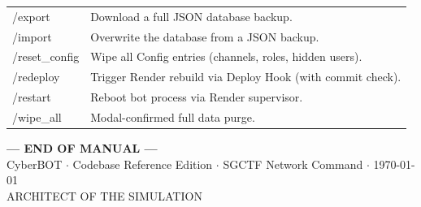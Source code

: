 \documentclass[12pt,a4paper]{report}
\begin{document}
\begin{longtable}{>{\ttfamily}l p{9.5cm}}
/export                & Download a full JSON database backup. \\
/import                & Overwrite the database from a JSON backup. \\
/reset\_config         & Wipe all Config entries (channels, roles, hidden users). \\
/redeploy             & Trigger Render rebuild via Deploy Hook (with commit check). \\
/restart              & Reboot bot process via Render supervisor. \\
/wipe\_all             & Modal-confirmed full data purge. \\
\bottomrule
\end{longtable}

\vspace{1cm}
\begin{center}
\begin{tcolorbox}[colback=cyberdark, coltext=white, colframe=cybergold,
                  width=13cm, center]
    \centering\color{cybergold}
    \large\textbf{--- END OF MANUAL ---}\\[0.3cm]
    \color{cybercyan}\small CyberBOT $\cdot$ Codebase Reference Edition $\cdot$ SGCTF Network Command $\cdot$ \today\\[0.2cm]
    \color{white!50}\footnotesize ARCHITECT OF THE SIMULATION
\end{tcolorbox}
\end{center}
\end{document}
